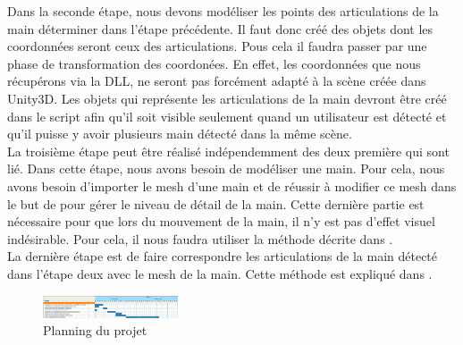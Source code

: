 Dans la seconde étape, nous devons modéliser les points des articulations de la main déterminer 
dans l'étape précédente. Il faut donc créé des objets dont les coordonnées seront ceux des articulations.
Pous cela il faudra passer par une phase de transformation des coordonées. En effet, les coordonnées
que nous récupérons via la DLL, ne seront pas forcément adapté à la scène créée dans Unity3D. Les 
objets qui représente les articulations de la main devront être créé dans le script afin qu'il 
soit visible seulement quand un utilisateur est détecté et qu'il puisse y avoir plusieurs main
détecté dans la même scène.\\

La troisième étape peut être réalisé indépendemment des deux première qui sont lié. Dans cette étape,
nous avons besoin de modéliser une main. Pour cela, nous avons besoin d'importer le mesh d'une main et
de réussir à modifier ce mesh dans le but de pour gérer le niveau de détail de la main. Cette dernière
partie est nécessaire pour que lors du mouvement de la main, il n'y est pas d'effet visuel indésirable.
Pour cela, il nous faudra utiliser la méthode décrite dans \cite{export:217428}.\\

La dernière étape est de faire correspondre les articulations de la main détecté dans l'étape deux avec
le mesh de la main. Cette méthode est expliqué dans \cite{export:217428}.

\begin{figure}
  \begin{center}
    \includegraphics[angle=-90, width=4cm]{images/planning.png}
    \caption{Planning du projet}
    \label{fig:planning}
  \end{center}
\end{figure}
